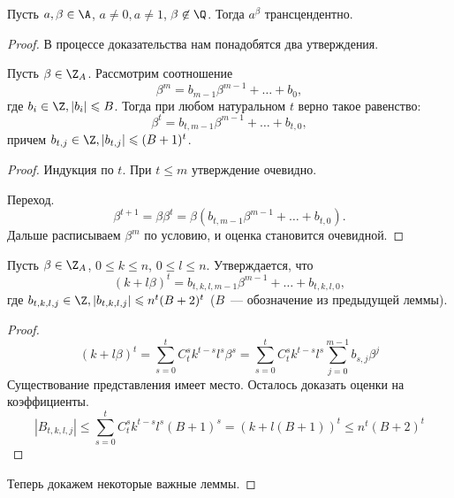 \begin{theorem}
  Пусть $a, \beta \in \A$, $a \ne 0, a \ne 1$, $\beta \not \in \Q$. Тогда $a^{\beta}$ трансцендентно.
\end{theorem}
\begin{proof}
  В процессе доказательства нам понадобятся два утверждения.
  \begin{stm}
    Пусть $\beta \in \Z_A$. Рассмотрим соотношение
    $$
      \beta^m = b_{m-1} \beta^{m-1} + \ldots + b_0,
    $$
    где $b_i \in \Z, |b_i| \leqslant B$. Тогда при любом натуральном $t$ верно такое равенство:
    $$
      \beta^t = b_{t,m-1} \beta^{m-1} + \ldots + b_{t,0},
    $$
    причем $b_{t,j} \in \Z, |b_{t,j}| \leqslant (B + 1)^t$.
  \end{stm}
  \begin{proof}
    Индукция по $t$. При $t \leqslant m$ утверждение очевидно.
    
    Переход.
    $$
      \beta^{t+1} = \beta \beta^t = \beta (b_{t,m-1} \beta^{m-1} + \ldots + b_{t,0}).
    $$
    Дальше расписываем $\beta^m$ по условию, и оценка становится очевидной.
  \end{proof}
  
  \begin{stm}
    Пусть $\beta \in \Z_A$, $0 \leqslant k \leqslant n$, $0 \leqslant l \leqslant n$. Утверждается, что
    $$
      (k + l \beta)^t = b_{t,k,l,m-1} \beta^{m-1} + \ldots + b_{t,k,l,0},
    $$
    где $b_{t,k,l,j} \in \Z, |b_{t,k,l,j}| \leqslant n^t (B + 2)^t$ ($B$~--- обозначение из предыдущей леммы).
  \end{stm}
  \begin{proof}
    $$
      (k+l\beta)^t = \sum_{s=0}^t C_t^s k^{t-s} l^s \beta^s = \sum_{s=0}^t C_t^s k^{t-s} l^s \sum_{j=0}^{m-1} b_{s,j} \beta^j
    $$
    Существование представления имеет место. Осталось доказать оценки на коэффициенты.
    $$
      |B_{t,k,l,j}| \leqslant \sum_{s=0}^t C_t^s k^{t-s} l^s (B+1)^s = (k + l(B + 1))^t \leqslant n^t (B+2)^t
    $$
  \end{proof}
  
  Теперь докажем некоторые важные леммы.
  

\end{proof}
